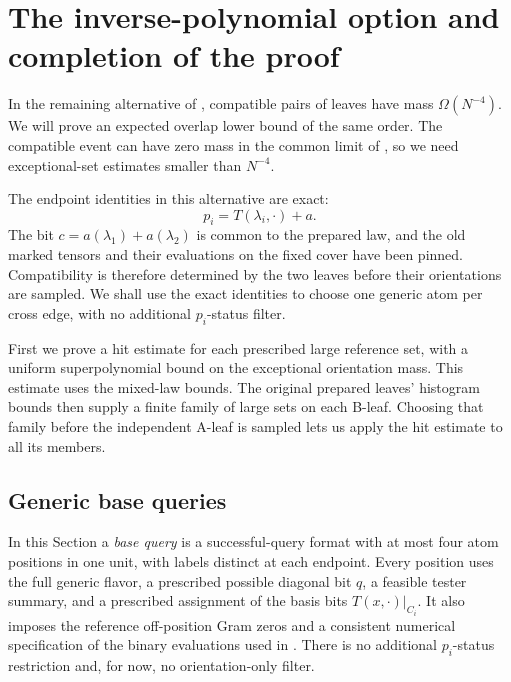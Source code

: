 \section{The inverse-polynomial option and completion of the proof}
\label{sec:rare-overlap}

In the remaining alternative of ,
compatible pairs of leaves have mass \(\Omega(N^{-4})\).
We will prove an expected overlap lower bound of the same order.
The compatible event can have zero mass in the common limit of
, so we need exceptional-set estimates smaller
than \(N^{-4}\).

The endpoint identities in this alternative are exact:
\begin{equation}
 p_i=T(\lambda_i,\cdot)+a.
\label{eq:rare-exact-prediction}
\end{equation}
The bit \(c=a(\lambda_1)+a(\lambda_2)\) is common to the prepared law,
and the old marked tensors and their evaluations on the fixed cover
have been pinned.  Compatibility is therefore determined by the two
leaves before their orientations are sampled.  We shall use the exact
identities to choose one generic atom per cross edge, with no additional
\(p_i\)-status filter.

First we prove a hit estimate for each prescribed large reference set,
with a uniform superpolynomial bound on the exceptional orientation
mass.  This estimate uses the mixed-law bounds.  The original prepared
leaves' histogram bounds then supply a finite family of large sets on
each B-leaf.  Choosing that family before the independent A-leaf is
sampled lets us apply the hit estimate to all its members.

\subsection{Generic base queries}

In this Section a \emph{base query} is a successful-query format with
at most four atom positions in one unit, with labels distinct at each
endpoint.  Every position uses the full generic flavor, a prescribed
possible diagonal bit \(q\), a feasible tester summary, and a prescribed
assignment of the basis bits
\(T(x,\cdot)|_{C_i}\).  It also imposes the reference off-position
Gram zeros and a consistent numerical specification of the binary
evaluations used in .
There is no additional \(p_i\)-status restriction and, for now, no
orientation-only filter.

